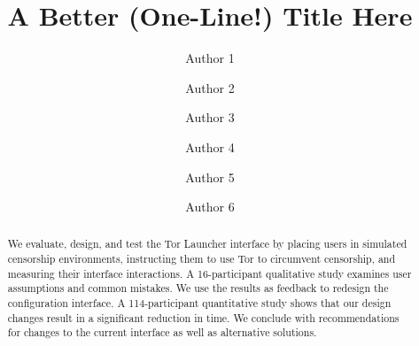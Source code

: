 \documentclass[USenglish,oneside,twocolumn]{article}
\begin{document}
   \author*[1]{Author 1}

  \author[2]{Author 2}

  \author[3]{Author 3}

  \author[4]{Author 4}

  \author[5]{Author 5}
  
  \author[6]{Author 6}

%
%
%
%
%  
%
%
%
%
%  
%   

  \title{\huge A Better (One-Line!) Title Here}



  \begin{abstract}
{
We evaluate, design, and test the Tor Launcher interface by
placing users in simulated censorship environments, instructing them to use Tor
to circumvent censorship, and measuring their interface interactions.
A 16-participant qualitative study examines user assumptions and common mistakes.
We use the results as feedback to redesign the configuration interface.
A 114-participant quantitative study shows that our design changes result in
a significant reduction in time. We conclude with recommendations for changes 
to the current interface as well as alternative solutions.}
\end{abstract}
\end{document}
